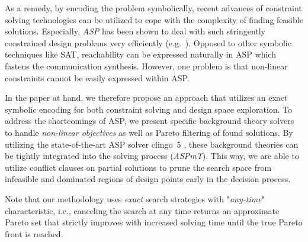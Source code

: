 As a remedy, by encoding the problem symbolically, recent advances of constraint solving technologies can be utilized to cope with the complexity of finding feasible solutions. Especially, \emph{\acf{ASP}} has been shown to deal with such stringently constrained design problems very efficiently (e.g.~\cite{Andres2013}). Opposed to other symbolic techniques like \ac{SAT}, reachability can be expressed naturally in \ac{ASP} which fastens the communication synthesis. However, one problem is that non-linear constraints cannot be easily expressed within \ac{ASP}. \par
In the paper at hand, we therefore propose an approach that utilizes an exact symbolic encoding for both constraint solving and design space exploration. To address the shortcomings of \ac{ASP}, we present specific background theory solvers to handle \emph{non-linear objectives} as well as Pareto filtering of found solutions. By utilizing the state-of-the-art \ac{ASP} solver clingo~5 \cite{gekakaosscwa16a}, these background theories can be tightly integrated into the solving process (\emph{\acf{ASPmT}}). This way, we are able to utilize conflict clauses on partial solutions to prune the search space from infeasible and dominated regions of design points early in the decision process. \par
Note that our methodology uses \emph{exact} search strategies with "\emph{any-time}" characteristic, i.e., canceling the search at any time returns an approximate Pareto set that strictly improves with increased solving time until the true Pareto front is reached.\par

